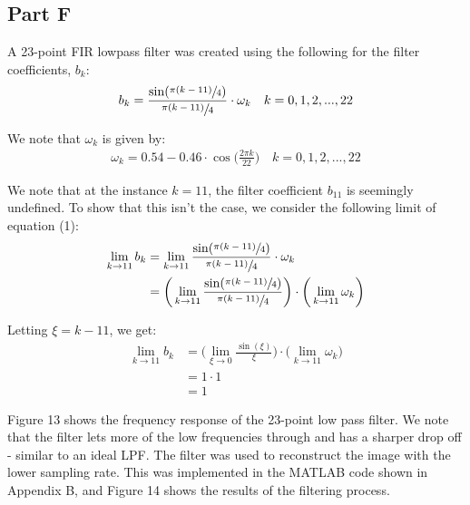 \documentclass{article}
\begin{document}
\subsection{Part F}
A 23-point FIR lowpass filter was created using the following for the filter coefficients, $b_k$:
\begin{align}
	b_k = \frac{\sin (\sfrac{\pi (k-11)}{4})}{\sfrac{\pi(k-11)}{4}} \cdot \omega_k \quad k = 0,1,2,...,22
\end{align}

We note that $\omega_k$ is given by:
\begin{align}
	\omega_k = 0.54 - 0.46 \cdot \cos \bigg(\frac{2 \pi k}{22} \bigg) \quad k = 0,1,2,...,22
\end{align}

We note that at the instance $k = 11$, the filter coefficient $b_{11}$ is seemingly undefined. To show that this isn't the case, we consider the following limit of equation (1):
\begin{align*}
	\lim_{k \rightarrow 11} b_k 	&= \lim_{k \rightarrow 11} \frac{\sin (\sfrac{\pi (k-11)}{4})}{\sfrac{\pi(k-11)}{4}} \cdot \omega_k\\
									&= \bigg(\lim_{k \rightarrow 11} \frac{\sin (\sfrac{\pi (k-11)}{4})}{\sfrac{\pi(k-11)}{4}} \bigg) \cdot \bigg(\lim_{k \rightarrow 11} \omega_k \bigg)
\end{align*}

Letting $\xi = k-11$, we get:
\begin{align*}
	\lim_{k \rightarrow 11} b_k &= \bigg(\lim_{\xi \rightarrow 0} \frac{\sin (\xi)}{\xi} \bigg) \cdot \bigg(\lim_{k \rightarrow 11} \omega_k \bigg)\\
								&= 1 \cdot 1\\
								&= 1
\end{align*}

Figure 13 shows the frequency response of the 23-point low pass filter. We note that the filter lets more of the low frequencies through and has a sharper drop off - similar to an ideal LPF. The filter was used to reconstruct the image with the lower sampling rate. This was implemented in the MATLAB code shown in Appendix B, and Figure 14 shows the results of the filtering process.
\end{document}
